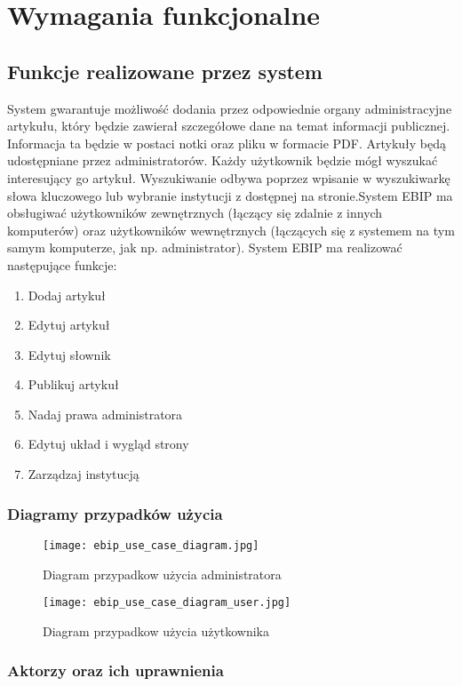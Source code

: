 \documentclass{article}
\begin{document}
\newpage
	
\section{Wymagania funkcjonalne}
	
\subsection{Funkcje realizowane przez system}

	System gwarantuje możliwość dodania przez odpowiednie organy administracyjne artykułu, który będzie zawierał szczegółowe dane na temat informacji publicznej. Informacja ta będzie w postaci notki oraz pliku w formacie PDF. Artykuły będą udostępniane przez administratorów. Każdy użytkownik będzie mógł wyszukać interesujący go artykuł. Wyszukiwanie odbywa poprzez wpisanie w wyszukiwarkę słowa kluczowego lub wybranie instytucji z dostępnej na stronie.System EBIP ma obsługiwać użytkowników zewnętrznych (łączący się zdalnie z innych komputerów) oraz użytkowników wewnętrznych (łączących się z systemem na tym samym komputerze, jak np. administrator).
	System EBIP ma realizować następujące funkcje:
\begin{enumerate}
	\item Dodaj artykuł
	\item Edytuj artykuł
	\item Edytuj słownik
	\item Publikuj artykuł
	\item Nadaj prawa administratora
	\item Edytuj układ i wygląd strony
	\item Zarządzaj instytucją
\end{enumerate}
	\newpage
	
\subsubsection{Diagramy przypadków użycia}

\begin{figure}[h!]
	\texttt{[image: ebip\_use\_case\_diagram.jpg]}
	\caption{Diagram przypadkow użycia administratora}
\end{figure}
	\newpage	
\begin{figure}[h!]
	\texttt{[image: ebip\_use\_case\_diagram\_user.jpg]}
	\caption{Diagram przypadkow użycia użytkownika}
\end{figure}
\subsubsection{Aktorzy oraz ich uprawnienia}
	
\end{document}
